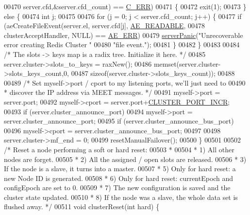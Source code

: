 \begin{DoxyCode}
{{{{{{{{00470         server.cfd,&server.cfd\_count) == \hyperlink{server_8h_af98ac28d5f4d23d7ed5985188e6fb7d1}{C\_ERR})
00471     \{
00472         exit(1);
00473     \} \textcolor{keywordflow}{else} \{
00474         \textcolor{keywordtype}{int} j;
00475 
00476         \textcolor{keywordflow}{for} (j = 0; j < server.cfd\_count; j++) \{
00477             \textcolor{keywordflow}{if} (aeCreateFileEvent(server.el, server.cfd[j], \hyperlink{ae_8h_a7a9a2162d007d09739955b4e55c65bf3}{AE\_READABLE},
00478                 clusterAcceptHandler, NULL) == \hyperlink{ae_8h_aa16dcf7effdf8f8df97f51b1cb51a9df}{AE\_ERR})
00479                     \hyperlink{server_8h_a11cc378e7778a830b41240578de3b204}{serverPanic}(\textcolor{stringliteral}{"Unrecoverable error creating Redis Cluster "}
00480                                 \textcolor{stringliteral}{"file event."});
00481         \}
00482     \}
00483 
00484     \textcolor{comment}{/* The slots -> keys map is a radix tree. Initialize it here. */}
00485     server.cluster->slots\_to\_keys = raxNew();
00486     memset(server.cluster->slots\_keys\_count,0,
00487            \textcolor{keyword}{sizeof}(server.cluster->slots\_keys\_count));
00488 
00489     \textcolor{comment}{/* Set myself->port / cport to my listening ports, we'll just need to}
00490 \textcolor{comment}{     * discover the IP address via MEET messages. */}
00491     myself->port = server.port;
00492     myself->cport = server.port+\hyperlink{cluster_8h_ac619a9ae48ab1431daa590fb5e75cea8}{CLUSTER\_PORT\_INCR};
00493     \textcolor{keywordflow}{if} (server.cluster\_announce\_port)
00494         myself->port = server.cluster\_announce\_port;
00495     \textcolor{keywordflow}{if} (server.cluster\_announce\_bus\_port)
00496         myself->cport = server.cluster\_announce\_bus\_port;
00497 
00498     server.cluster->mf\_end = 0;
00499     resetManualFailover();
00500 \}
00501 
00502 \textcolor{comment}{/* Reset a node performing a soft or hard reset:}
00503 \textcolor{comment}{ *}
00504 \textcolor{comment}{ * 1) All other nodes are forget.}
00505 \textcolor{comment}{ * 2) All the assigned / open slots are released.}
00506 \textcolor{comment}{ * 3) If the node is a slave, it turns into a master.}
00507 \textcolor{comment}{ * 5) Only for hard reset: a new Node ID is generated.}
00508 \textcolor{comment}{ * 6) Only for hard reset: currentEpoch and configEpoch are set to 0.}
00509 \textcolor{comment}{ * 7) The new configuration is saved and the cluster state updated.}
00510 \textcolor{comment}{ * 8) If the node was a slave, the whole data set is flushed away. */}
00511 \textcolor{keywordtype}{void} clusterReset(\textcolor{keywordtype}{int} hard) \{
}}}}}}}}
\end{DoxyCode}
